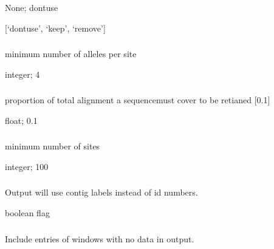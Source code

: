 \documentclass[letterpaper,11pt,english]{sphinxmanual}
\begin{document}
 None;  dontuse

 {[}‘dontuse’, ‘keep’, ‘remove’{]}


\subsubsection{}
\label{\detokenize{prog_desc:min-depth-mindepth}}
 minimum number of alleles per site

 integer;  4


\subsubsection{}
\label{\detokenize{prog_desc:min-seq-coverage-minseqcoverage}}
 proportion of total alignment a sequencemust cover to be retianed {[}0.1{]}

 float;  0.1


\subsubsection{}
\label{\detokenize{prog_desc:min-sites-minsites}}
 minimum number of sites

 integer;  100


\subsubsection{}
\label{\detokenize{prog_desc:output-contig-labels-outputcontiglabels}}
 Output will use contig labels instead of id numbers.

 boolean flag


\subsubsection{}
\label{\detokenize{prog_desc:output-empty-outputempty}}
 Include entries of windows with no data in output.
\end{document}
